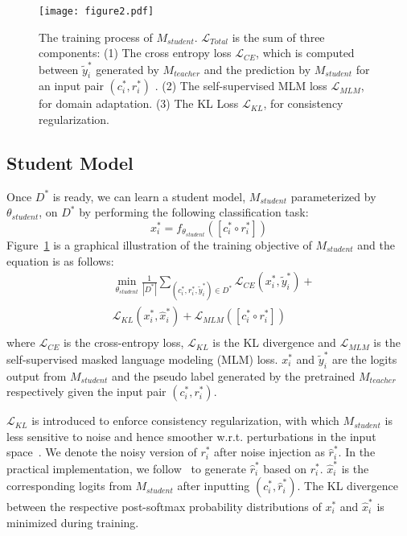 \documentclass[letterpaper]{article} \usepackage{aaai22}  \usepackage{times}  \usepackage{helvet}  \usepackage{courier}  \usepackage[hyphens]{url}  \usepackage{graphicx} \urlstyle{rm} \def\UrlFont{\rm}  \usepackage{natbib}  \usepackage{caption} \DeclareCaptionStyle{ruled}{labelfont=normalfont,labelsep=colon,strut=off} \frenchspacing  \setlength{\pdfpagewidth}{8.5in}  \setlength{\pdfpageheight}{11in}  \usepackage{algorithm}
\begin{document}
\begin{figure}[t]
\centering
\texttt{[image: figure2.pdf]} \caption{The training process of $M_{student}$. $\mathcal{L}_{Total}$ is the sum of three components: (1) The cross entropy loss $\mathcal{L}_{CE}$, which is computed between $\tilde{y}_i^{*}$ generated by $M_{teacher}$ and the prediction by $M_{student}$ for an input pair $(c_i^{*},r_i^{*})$ . (2) The self-supervised MLM loss $\mathcal{L}_{MLM}$, for domain adaptation. (3) The KL Loss $\mathcal{L}_{KL}$, for consistency regularization.}    

\label{student-model-objective}
\end{figure}


\subsection{Student Model}
\label{subsec:student-model}
Once $D^{\text{*}}$ is ready, we can learn a student model, $M_{student}$ parameterized by $\theta_{student}$, on $D^{\text{*}}$ by performing the following classification task:
\begin{equation}
x_i^{\text{*}} = f_{\theta_{student}}([c_i^{\text{*}} \circ r_i^{\text{*}}])
\label{eq:student_prediction}
\end{equation}
Figure~\ref{student-model-objective} is a graphical illustration of the training objective of $M_{student}$ and the equation is as follows: 
\begin{equation}
\begin{aligned}
& \underset{\theta_{student}}{\min}\frac{1}{|D^{\text{*}}|} \sum_{(c_i^{\text{*}}, r_i^{\text{*}}, \tilde{y}_i^{\text{*}})\in{D^{\text{*}}}}{\mathcal{L}_{CE}(x_i^{\text{*}}, \tilde{y}_i^{\text{*}})} +  \\
& \mathcal{L}_{KL}(x_i^{\text{*}}, \hat{x}_i^{\text{*}}) + \mathcal{L}_{MLM}([c_i^{\text{*}} \circ r_i^{\text{*}}]) \\
\end{aligned}
\label{eq:4}
\end{equation}
where $\mathcal{L}_{CE}$ is the cross-entropy loss, $\mathcal{L}_{KL}$ is the KL divergence and $\mathcal{L}_{MLM}$ is the self-supervised masked language modeling (MLM) loss. $x_i^{\text{*}}$ and $\tilde{y}_i^{\text{*}}$ are the logits output from $M_{student}$ and the pseudo label generated by the pretrained $M_{teacher}$ respectively given the input pair $(c_i^{\text{*}}, r_i^{\text{*}})$. 


$\mathcal{L}_{KL}$ is introduced to enforce consistency regularization, with which $M_{student}$ is less sensitive to noise and hence smoother w.r.t. perturbations in the input space~\citep{xie2020unsupervised}. We denote the noisy version of $r_i^{\text{*}}$ after noise injection as $\hat{r}_i^{\text{*}}$. In the practical implementation, we follow~\citep{he2019revisiting} to generate $\hat{r}_i^{\text{*}}$ based on $r_i^{\text{*}}$. $\hat{x}_i^{\text{*}}$ is the corresponding logits from $M_{student}$ after inputting $(c_i^{\text{*}}, \hat{r}_i^{\text{*}})$. The KL divergence between the respective post-softmax probability distributions of $x_i^{\text{*}}$ and $\hat{x}_i^{\text{*}}$ is minimized during training.
\end{document}
